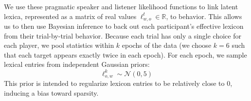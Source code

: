 We use these pragmatic speaker and listener likelihood functions to link latent lexica, represented as a matrix of real values $\ell_{w,o}^t \in \mathbb{R}$, to behavior.
%
This allows us to then use Bayesian inference to back out each participant's effective lexicon from their trial-by-trial behavior.
Because each trial has only a single choice for each player, we pool statistics within $k$ epochs of the data (we choose $k=6$ such that each target appears exactly twice in each epoch). 
For each epoch, we sample lexical entries from independent Gaussian priors: $$\ell_{o,w}^k\sim\mathcal{N}(0, 5)$$ This prior is intended to regularize lexicon entries to be relatively close to 0, inducing a bias toward sparsity. %

